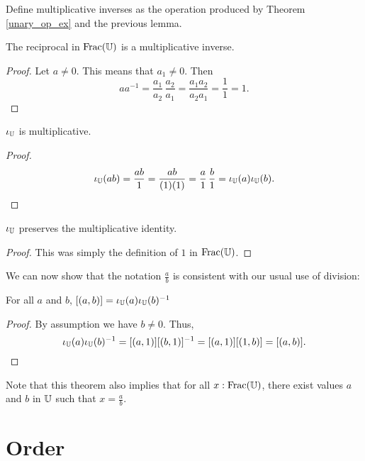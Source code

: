 \documentclass[../../math.tex]{subfiles}
\begin{document}
\begin{definition}
    Define multiplicative inverses as the operation produced by Theorem
    \ref{unary_op_ex} and the previous lemma.
\end{definition}

\begin{instance}
    The reciprocal in $\operatorname{Frac}(\mathbb{U})$ is a multiplicative inverse.
\end{instance}
\begin{proof}
    Let $a \neq 0$.  This means that $a_1 \neq 0$.  Then
    \[
        a a^{-1} = \frac{a_1}{a_2} \, \frac{a_2}{a_1}
        = \frac{a_1a_2}{a_2a_1}
        = \frac{1}{1}
        = 1.
    \]
\end{proof}

\begin{instance}
    $\iota_{\mathbb{U}}$ is multiplicative.
\end{instance}
\begin{proof}
    \[
        \iota_{\mathbb{U}}(ab)
        = \frac{ab}{1}
        = \frac{ab}{(1)(1)}
        = \frac{a}{1} \, \frac{b}{1}
        = \iota_{\mathbb{U}}(a) \iota_{\mathbb{U}}(b).
    \]
\end{proof}

\begin{instance}
    $\iota_{\mathbb{U}}$ preserves the multiplicative identity.
\end{instance}
\begin{proof}
    This was simply the definition of $1$ in $\operatorname{Frac}(\mathbb{U})$.
\end{proof}

We can now show that the notation $\frac{a}{b}$ is consistent with our usual use
of division:

\begin{theorem}
    For all $a$ and $b$, $[(a, b)] = \iota_{\mathbb{U}}(a) \iota_{\mathbb{U}}(b)^{-1}$
\end{theorem}
\begin{proof}
    By assumption we have $b \neq 0$.  Thus,
    \[
        \iota_{\mathbb{U}}(a) \iota_{\mathbb{U}}(b)^{-1}
        = [(a, 1)] [(b, 1)]^{-1}
        = [(a, 1)] [(1, b)]
        = [(a, b)].
    \]
\end{proof}

Note that this theorem also implies that for all $x : \operatorname{Frac}(\mathbb{U})$, there exist
values $a$ and $b$ in $\mathbb{U}$ such that $x = \frac{a}{b}$.

\section{Order}
\end{document}

